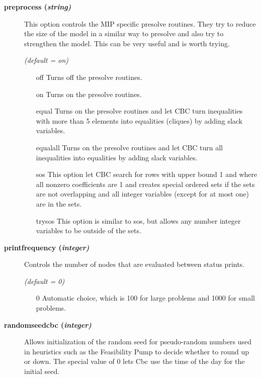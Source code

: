 \begin{description}
\item[\label{preprocess}\hypertarget{preprocess}
{\textbf{preprocess (\slshape{string})}}]\hspace{1.0in}

This option controls the MIP specific presolve routines.
They try to reduce the size of the model in a similar way to presolve and also try to strengthen the model.
This can be very useful and is worth trying.

\textsl{(default = on)}
\begin{itemize}
\item[off] 
Turns off the presolve routines.
\item[on] 
Turns on the presolve routines.
\item[equal] 
Turns on the presolve routines and let CBC turn inequalities with more than 5 elements into equalities (cliques) by adding slack variables.
\item[equalall] 
Turns on the presolve routines and let CBC turn all inequalities into equalities by adding slack variables.
\item[sos] 
This option let CBC search for rows with upper bound 1 and where all nonzero coefficients are 1 and creates special ordered sets if the sets are not overlapping and all integer variables (except for at most one) are in the sets.
\item[trysos] 
This option is similar to sos, but allows any number integer variables to be outside of the sets.
\end{itemize}

\item[\label{printfrequency}\hypertarget{printfrequency}
{\textbf{printfrequency (\slshape{integer})}}]\hspace{1.0in}

Controls the number of nodes that are evaluated between status prints.

\textsl{(default = 0)}
\begin{itemize}
\item[0] 
Automatic choice, which is 100 for large problems and 1000 for small problems.
\end{itemize}

\item[\label{randomseedcbc}\hypertarget{randomseedcbc}
{\textbf{randomseedcbc (\slshape{integer})}}]\hspace{1.0in}

Allows initialization of the random seed for pseudo-random numbers used in heuristics such as the Feasibility Pump to decide whether to round up or down.
The special value of 0 lets Cbc use the time of the day for the initial seed.


\end{description}
